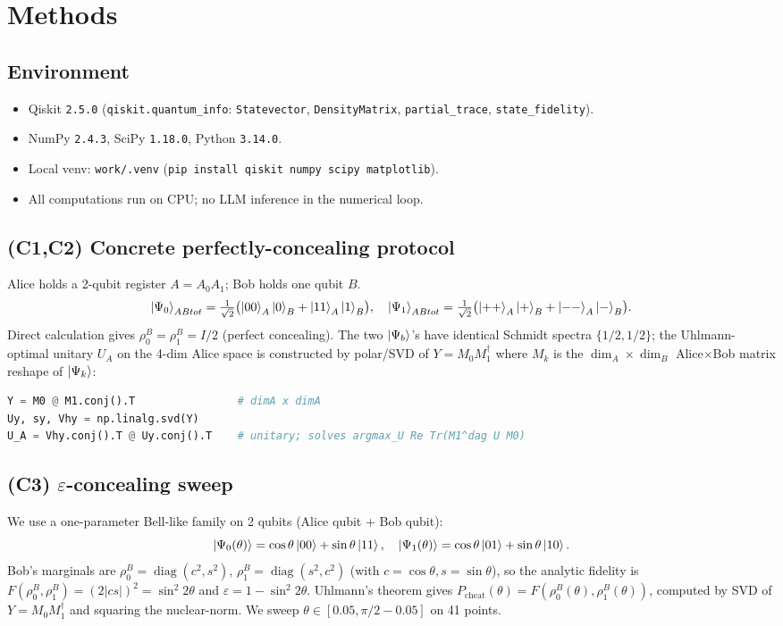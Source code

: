 \documentclass[11pt]{article}
\begin{document}
\section{Methods}

\subsection{Environment}
\begin{itemize}[nosep]
\item Qiskit \texttt{2.5.0} (\texttt{qiskit.quantum\_info}: \texttt{Statevector},
      \texttt{DensityMatrix}, \texttt{partial\_trace}, \texttt{state\_fidelity}).
\item NumPy \texttt{2.4.3}, SciPy \texttt{1.18.0}, Python \texttt{3.14.0}.
\item Local venv: \texttt{work/.venv} (\texttt{pip install qiskit numpy scipy matplotlib}).
\item All computations run on CPU; no LLM inference in the numerical loop.
\end{itemize}

\subsection{(C1,C2) Concrete perfectly-concealing protocol}
Alice holds a 2-qubit register $A=A_0A_1$; Bob holds one qubit $B$.
\[
\ket{\Psi_0}_{ABtot}=\tfrac{1}{\sqrt2}\bigl(\ket{00}_A\ket{0}_B+\ket{11}_A\ket{1}_B\bigr),\quad
\ket{\Psi_1}_{ABtot}=\tfrac{1}{\sqrt2}\bigl(\ket{++}_A\ket{+}_B+\ket{--}_A\ket{-}_B\bigr).
\]
Direct calculation gives $\rho^B_0=\rho^B_1=I/2$ (perfect concealing).
The two $\ket{\Psi_b}$'s have identical Schmidt spectra $\{1/2,1/2\}$; the
Uhlmann-optimal unitary $U_A$ on the 4-dim Alice space is constructed by
polar/SVD of $Y=M_0M_1^\dagger$ where $M_k$ is the $\dim_A\times\dim_B$
Alice$\times$Bob matrix reshape of $\ket{\Psi_k}$:
\begin{lstlisting}[language=Python]
Y = M0 @ M1.conj().T                # dimA x dimA
Uy, sy, Vhy = np.linalg.svd(Y)
U_A = Vhy.conj().T @ Uy.conj().T    # unitary; solves argmax_U Re Tr(M1^dag U M0)
\end{lstlisting}

\subsection{(C3) $\varepsilon$-concealing sweep}
We use a one-parameter Bell-like family on 2 qubits (Alice qubit + Bob qubit):
\[
\ket{\Psi_0(\theta)}=\cos\theta\ket{00}+\sin\theta\ket{11},\quad
\ket{\Psi_1(\theta)}=\cos\theta\ket{01}+\sin\theta\ket{10}.
\]
Bob's marginals are $\rho^B_0=\operatorname{diag}(c^2,s^2)$,
$\rho^B_1=\operatorname{diag}(s^2,c^2)$ (with $c=\cos\theta,s=\sin\theta$),
so the analytic fidelity is $F(\rho^B_0,\rho^B_1)=(2|cs|)^2=\sin^2 2\theta$
and $\varepsilon=1-\sin^2 2\theta$.  Uhlmann's theorem gives
$P_\mathrm{cheat}(\theta)=F(\rho^B_0(\theta),\rho^B_1(\theta))$, computed
by SVD of $Y=M_0M_1^\dagger$ and squaring the nuclear-norm.  We sweep
$\theta\in[0.05,\pi/2-0.05]$ on 41 points.
\end{document}

